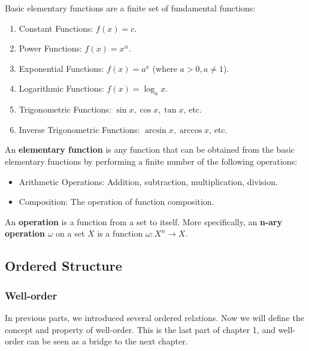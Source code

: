 \begin{definition}
Basic elementary functions are a finite set of fundamental functions:
\begin{enumerate}
    \item Constant Functions: $f(x) = c$.
    \item Power Functions: $f(x) = x^\alpha$.
    \item Exponential Functions: $f(x) = a^x$ (where $a > 0, a \ne 1$).
    \item Logarithmic Functions: $f(x) = \log_a x$.
    \item Trigonometric Functions: $\sin x, \cos x, \tan x$, etc.
    \item Inverse Trigonometric Functions: $\arcsin x, \arccos x$, etc.
\end{enumerate}
\end{definition}

\begin{definition}
An \textbf{elementary function} is any function that can be obtained from the basic elementary functions by performing a finite number of the following operations:
\begin{itemize}
    \item Arithmetic Operations: Addition, subtraction, multiplication, division.
    \item Composition: The operation of function composition.
\end{itemize}
\end{definition}

\begin{definition}[Operation]
An \textbf{operation} is a function from a set to itself. More specifically, an \textbf{n-ary operation} $\omega$ on a set $X$ is a function $\omega: X^n \to X$.
\end{definition}

\subsection{Ordered Structure}

\subsubsection{Well-order}
In previous parts, we introduced several ordered relations. Now we will define the concept and property of well-order. This is the last part of chapter 1, and well-order can be seen as a bridge to the next chapter.

